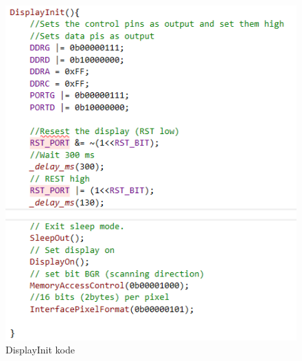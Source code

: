 \begin{figure}[H]
	\centering
	\includegraphics[width = 350pt]{Img/DisplayInit_Code.png}
	\caption{DisplayInit kode}
	\label{fig:DisplayInit_Code}
\end{figure}